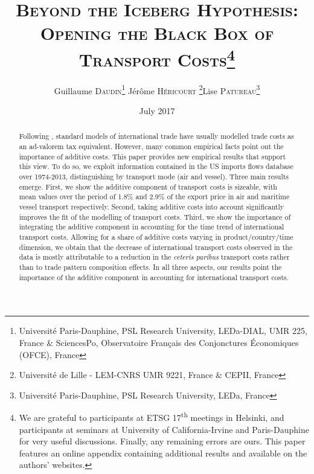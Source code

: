 \documentclass[a4paper,11pt]{article}
\begin{document}
\title{\textsc{Beyond the Iceberg Hypothesis: \\Opening the Black Box of Transport Costs}\thanks{We are grateful to participants at ETSG 17\textsuperscript{th} meetings in Helsinki, and participants at seminars at University of California-Irvine and Paris-Dauphine for very useful discussions. Finally, any remaining errors are ours. This paper features an online appendix containing additional results and available on the authors' websites.}}
\author{Guillaume \textsc{Daudin}\thanks{%
Universit\'{e} Paris-Dauphine, PSL Research University, LEDa-DIAL, UMR 225, France \&
SciencesPo, Observatoire Français des Conjonctures \'{E}conomiques (OFCE), France}  \qquad J\'{e}r\^{o}me \textsc{H\'{e}ricourt} \thanks{Universit\'{e} de Lille - LEM-CNRS UMR 9221, France \& CEPII, France}\qquad Lise \textsc{Patureau}\thanks{Universit\'{e} Paris-Dauphine, PSL Research University, LEDa, France } }


\date{July 2017}
 \maketitle
\bigskip

\begin{abstract}
Following \cite{samuelson1954}, standard models of international trade have usually modelled trade costs as an ad-valorem tax equivalent. However, many common empirical facts point out the importance of additive costs. This paper provides new empirical results that support this view. To do so, we exploit information contained in the US imports flows database over 1974-2013, distinguishing by transport mode (air and vessel). Three main results emerge. First, we show the additive component of transport costs is sizeable, with mean values over the period of 1.8\% and 2.9\% of the export price in air and maritime vessel transport respectively. Second, taking additive costs into account significantly improves the fit of the modelling of transport costs. Third, we show the importance of integrating the additive component in accounting for the time trend of international transport costs. Allowing for a share of additive costs varying in product/country/time dimension, we obtain that the decrease of international transport costs observed in the data is mostly attributable to a reduction in the \textit{ceteris paribus} transport costs rather than to trade pattern composition effects. In all three aspects, our results point the importance of the additive component in accounting for international transport costs.

\end{abstract}
\end{document}
